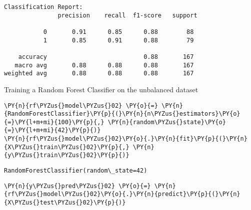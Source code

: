     \begin{Verbatim}[commandchars=\\\{\}]
Classification Report:
               precision    recall  f1-score   support

           0       0.91      0.85      0.88        88
           1       0.85      0.91      0.88        79

    accuracy                           0.88       167
   macro avg       0.88      0.88      0.88       167
weighted avg       0.88      0.88      0.88       167

    \end{Verbatim}

    Training a Random Forest Classifier on the unbalanced dataset

    \begin{tcolorbox}[breakable, size=fbox, boxrule=1pt, pad at break*=1mm,colback=cellbackground, colframe=cellborder]
\begin{Verbatim}[commandchars=\\\{\}]
\PY{n}{rf\PYZus{}model\PYZus{}02} \PY{o}{=} \PY{n}{RandomForestClassifier}\PY{p}{(}\PY{n}{n\PYZus{}estimators}\PY{o}{=}\PY{l+m+mi}{100}\PY{p}{,} \PY{n}{random\PYZus{}state}\PY{o}{=}\PY{l+m+mi}{42}\PY{p}{)}
\PY{n}{rf\PYZus{}model\PYZus{}02}\PY{o}{.}\PY{n}{fit}\PY{p}{(}\PY{n}{X\PYZus{}train\PYZus{}02}\PY{p}{,} \PY{n}{y\PYZus{}train\PYZus{}02}\PY{p}{)}
\end{Verbatim}
\end{tcolorbox}

            \begin{tcolorbox}[breakable, size=fbox, boxrule=.5pt, pad at break*=1mm, opacityfill=0]
\begin{Verbatim}[commandchars=\\\{\}]
RandomForestClassifier(random\_state=42)
\end{Verbatim}
\end{tcolorbox}
        
    \begin{tcolorbox}[breakable, size=fbox, boxrule=1pt, pad at break*=1mm,colback=cellbackground, colframe=cellborder]
\begin{Verbatim}[commandchars=\\\{\}]
\PY{n}{y\PYZus{}pred\PYZus{}02} \PY{o}{=} \PY{n}{rf\PYZus{}model\PYZus{}02}\PY{o}{.}\PY{n}{predict}\PY{p}{(}\PY{n}{X\PYZus{}test\PYZus{}02}\PY{p}{)}
\end{Verbatim}
\end{tcolorbox}

